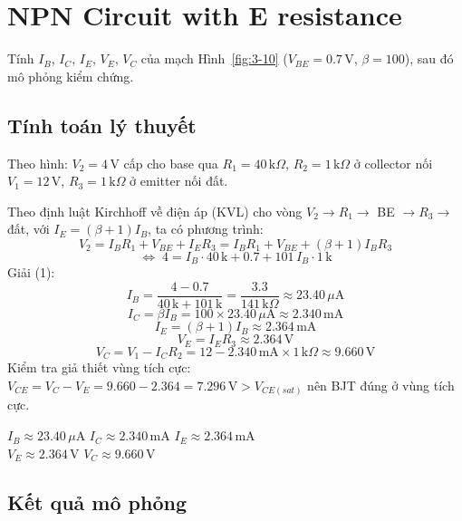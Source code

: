 \section{NPN Circuit with E resistance}
Tính $I_B$, $I_C$, $I_E$, $V_E$, $V_C$ của mạch Hình~\ref{fig:3-10} ($V_{BE} = 0.7\,\text{V}$, $\beta = 100$), sau đó mô phỏng kiểm chứng.


\subsection{Tính toán lý thuyết}
Theo hình: $V_2 = 4\,\text{V}$ cấp cho base qua $R_1 = 40\,\text{k}\Omega$, $R_2 = 1\,\text{k}\Omega$ ở collector nối $V_1 = 12\,\text{V}$, $R_3 = 1\,\text{k}\Omega$ ở emitter nối đất.

Theo định luật Kirchhoff về điện áp (KVL) cho vòng $V_2 \to R_1 \to$ BE $\to R_3 \to$ đất, với $I_E = (\beta+1) I_B$, ta có phương trình:
\[ V_2 = I_B R_1 + V_{BE} + I_E R_3 = I_B R_1 + V_{BE} + (\beta+1) I_B R_3 \]
\[ \Leftrightarrow\; 4 = I_B\cdot 40\,\text{k} + 0.7 + 101\, I_B \cdot 1\,\text{k} \tag{1} \]
Giải (1):
\[ I_B = \frac{4 - 0.7}{40\,\text{k} + 101\,\text{k}} = \frac{3.3}{141\,\text{k}\Omega} \approx 23.40\,\mu\text{A} \]
\[ I_C = \beta I_B = 100\times 23.40\,\mu\text{A} \approx 2.340\,\text{mA} \]
\[ I_E = (\beta+1) I_B \approx 2.364\,\text{mA} \]
\[ V_E = I_E R_3 \approx 2.364\,\text{V} \]
\[ V_C = V_1 - I_C R_2 = 12 - 2.340\,\text{mA}\times 1\,\text{k}\Omega \approx 9.660\,\text{V} \]
Kiểm tra giả thiết vùng tích cực: $V_{CE} = V_C - V_E = 9.660 - 2.364 = 7.296\,\text{V} > V_{CE(sat)}$ nên BJT đúng ở vùng tích cực.

\begin{dapsobox}
$I_B \approx 23.40\,\mu\text{A}$ \quad $I_C \approx 2.340\,\text{mA}$ \quad $I_E \approx 2.364\,\text{mA}$ \\
$V_E \approx 2.364\,\text{V}$ \quad $V_C \approx 9.660\,\text{V}$
\end{dapsobox}

\subsection{Kết quả mô phỏng}


